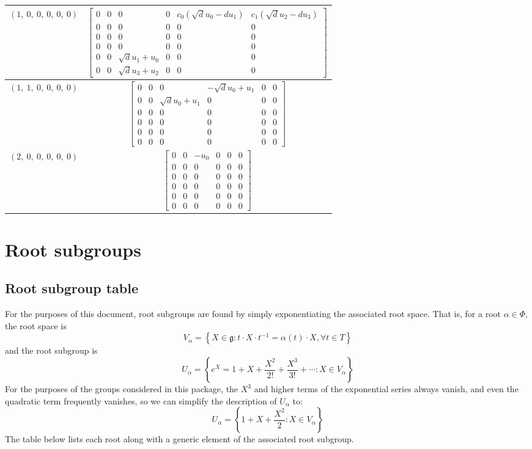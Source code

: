 \documentclass[11pt]{article}
\newcommand{\noi}{\noindent}
\newcommand{\inv}{^{-1}}
\newcommand{\lb}{\left\{}
\newcommand{\rb}{\right\}}
\newcommand{\frakg}{\mathfrak{g}}
\theoremstyle{definition}
\begin{document}
\begin{longtable}{|l|c|}
    \hline
    $\left( 1, \  0, \  0, \  0, \  0, \  0\right)$ & ${\left[\begin{matrix}0 & 0 & 0 & 0 & c_{0} \left(\sqrt{d} u_{0} - d u_{1}\right) & c_{1} \left(\sqrt{d} u_{2} - d u_{3}\right)\\0 & 0 & 0 & 0 & 0 & 0\\0 & 0 & 0 & 0 & 0 & 0\\0 & 0 & 0 & 0 & 0 & 0\\0 & 0 & \sqrt{d} u_{1} + u_{0} & 0 & 0 & 0\\0 & 0 & \sqrt{d} u_{3} + u_{2} & 0 & 0 & 0\end{matrix}\right]}$ \\
    \hline
    $\left( 1, \  1, \  0, \  0, \  0, \  0\right)$ & ${\left[\begin{matrix}0 & 0 & 0 & - \sqrt{d} u_{0} + u_{1} & 0 & 0\\0 & 0 & \sqrt{d} u_{0} + u_{1} & 0 & 0 & 0\\0 & 0 & 0 & 0 & 0 & 0\\0 & 0 & 0 & 0 & 0 & 0\\0 & 0 & 0 & 0 & 0 & 0\\0 & 0 & 0 & 0 & 0 & 0\end{matrix}\right]}$ \\
    \hline
    $\left( 2, \  0, \  0, \  0, \  0, \  0\right)$ & ${\left[\begin{matrix}0 & 0 & - u_{0} & 0 & 0 & 0\\0 & 0 & 0 & 0 & 0 & 0\\0 & 0 & 0 & 0 & 0 & 0\\0 & 0 & 0 & 0 & 0 & 0\\0 & 0 & 0 & 0 & 0 & 0\\0 & 0 & 0 & 0 & 0 & 0\end{matrix}\right]}$ \\
    \hline
\end{longtable}


\newpage
\section{Root subgroups}

\subsection{Root subgroup table}

\noi For the purposes of this document, root subgroups are found by simply exponentiating the associated root space. That is, for a root $\alpha \in \Phi$, the root space is
\[
	V_\alpha = \lb X \in \frakg : t \cdot X \cdot t \inv = \alpha(t) \cdot X, \forall t \in T \rb
\]
and the root subgroup is
\[
	U_\alpha = \lb e^X = 1 + X + \frac{X^2}{2!} + \frac{X^3}{3!} + \cdots : X \in V_\alpha \rb
\]
For the purposes of the groups considered in this package, the $X^3$ and higher terms of the exponential series always vanish, and even the quadratic term frequently vanishes, so we can simplify the description of $U_\alpha$ to:
\[
	U_\alpha = \lb 1 + X + \frac{X^2}{2} : X \in V_\alpha \rb
\]
The table below lists each root along with a generic element of the associated root subgroup.
\end{document}
